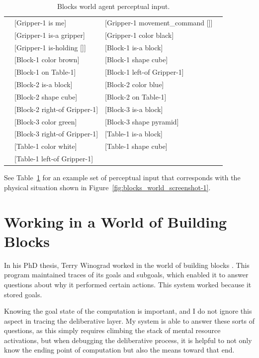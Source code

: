 \begin{table}
  \myfloatalign
  \begin{tabularx}{\textwidth}{XllX}
    & [Gripper-1 is me] & [Gripper-1 movement\_command []] & \\
    & [Gripper-1 is-a gripper] & [Gripper-1 color black] & \\
    & [Gripper-1 is-holding []] & [Block-1 is-a block] & \\
    & [Block-1 color brown] & [Block-1 shape cube] & \\
    & [Block-1 on Table-1] & [Block-1 left-of Gripper-1] & \\
    & [Block-2 is-a block] & [Block-2 color blue] & \\
    & [Block-2 shape cube] & [Block-2 on Table-1] & \\
    & [Block-2 right-of Gripper-1] & [Block-3 is-a block] & \\
    & [Block-3 color green] & [Block-3 shape pyramid] & \\
    & [Block-3 right-of Gripper-1] & [Table-1 is-a block] & \\
    & [Table-1 color white] & [Table-1 shape cube] & \\
    & [Table-1 left-of Gripper-1] & &
  \end{tabularx}
  \caption[Blocks world agent perceptual input.]{Blocks world agent perceptual input.}
  \label{tab:blocks_world_agent_perceptions}
\end{table}

See Table~\ref{tab:blocks_world_agent_perceptions} for an example set of perceptual input that corresponds with the physical situation shown in Figure~\ref{fig:blocks_world_screenshot-1}.

\section{Working in a World of Building Blocks}

In his PhD thesis, Terry Winograd worked in the world of building
blocks \citep{winograd:1970}.  This program maintained traces of its
goals and subgoals, which enabled it to answer questions about why it
performed certain actions.  This system worked because it stored
goals.

Knowing the goal state of the computation is important, and I do not
ignore this aspect in tracing the deliberative layer.  My system is
able to answer these sorts of questions, as this simply requires
climbing the stack of mental resource activations, but when debugging
the deliberative process, it is helpful to not only know the ending
point of computation but also the means toward that end.

